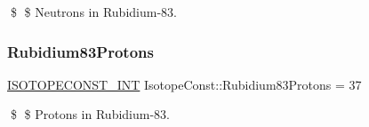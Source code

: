 \$ \$ Neutrons in Rubidium-\/83. \mbox{\label{group___isotope_const-_rubidium-_rb83_gadcee2c0d63d41b13bbde02910e845194}} 
\subsubsection{\texorpdfstring{Rubidium83\+Protons}{Rubidium83Protons}}
{\footnotesize\ttfamily \mbox{\hyperlink{group___isotope_const-_macros_ga5f18360b3e99483a35c32d789e62621c}{I\+S\+O\+T\+O\+P\+E\+C\+O\+N\+S\+T\+\_\+\+I\+NT}} Isotope\+Const\+::\+Rubidium83\+Protons = 37}

\$ \$ Protons in Rubidium-\/83. 